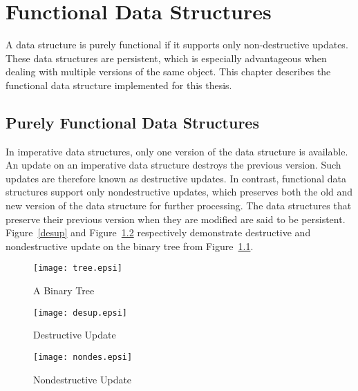 \chapter{Functional Data Structures}
\label{fds}
A data structure is purely functional if it supports only
non-destructive updates. These data structures are persistent, which is
especially advantageous when dealing with multiple versions of the same
object. This chapter describes the functional data structure implemented
for this thesis.

\section{Purely Functional Data Structures}

In imperative data structures, only one version of the data structure is
available. An update on an imperative data structure destroys the
previous version. Such updates are therefore known as destructive
updates. In contrast, functional data structures support only
nondestructive updates, which preserves both the old and new version of
the data structure for further processing. The data structures that
preserve their previous version when they are modified are said to be
persistent. Figure~\ref{desup} and Figure~\ref{nondesup} respectively
demonstrate destructive and nondestructive update on the binary tree
from Figure~\ref{tree}.





\begin{figure} [htb]
  \centering
  \texttt{[image: tree.epsi]}
  \caption{A Binary Tree}
  \label{tree}
\end{figure}


\begin{figure}[ht]
  \begin{adjustwidth}{-2em}{}
  \begin{minipage}[b]{0.5\linewidth}
    \centering
    \texttt{[image: desup.epsi]}
    \caption{Destructive Update}
    \label{desup}
  \end{minipage}
  \hspace{0.6cm}
  \begin{minipage}[b]{0.5\linewidth}
    \centering
    \texttt{[image: nondes.epsi]}
    \caption{Nondestructive Update}
    \label{nondesup}
  \end{minipage}
  \end{adjustwidth}
\end{figure}

